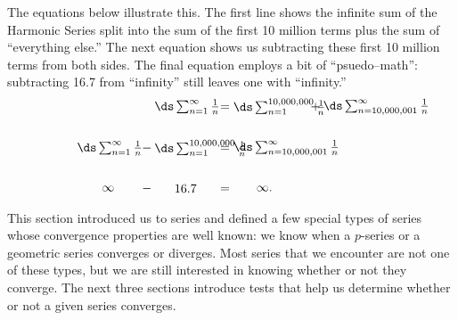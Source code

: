 The equations below illustrate this. The first line shows the infinite sum of the Harmonic Series split into the sum of the first 10 million terms plus the sum of ``everything else.'' The next equation shows us subtracting these first 10 million terms from both sides. The final equation employs a bit of ``psuedo--math'': subtracting 16.7 from ``infinity'' still leaves one with ``infinity.''
\begin{align*}
 \parbox{50pt}{\centering$\ds\sum_{n=1}^\infty \frac1n$} &= \parbox{50pt}{\centering$\ds\sum_{n=1}^{10,000,000}\frac1n$}\quad + \parbox{50pt}{\centering$\ds\sum_{n=10,000,001}^\infty \frac1n$} \rule[-20pt]{0pt}{1pt} \\
 \parbox{50pt}{\centering$\ds\sum_{n=1}^\infty \frac1n$} - \parbox{50pt}{\centering$\ds\sum_{n=1}^{10,000,000}\frac1n$}&= \parbox{50pt}{\centering$\ds\sum_{n=10,000,001}^\infty \frac1n$} \rule[-20pt]{0pt}{1pt}\\
\parbox{50pt}{\centering	$\infty$} - \parbox{50pt}{\centering $16.7$} &=  \parbox{50pt}{\centering$\infty.$}
\end{align*}													

This section introduced us to series and defined a few special types of series whose convergence properties are well known: we know when a $p$-series or a geometric series converges or diverges. Most series that we encounter are not one of these types, but we are still interested in knowing whether or not they converge. The next three sections introduce tests that help us determine whether or not a given series converges. 


